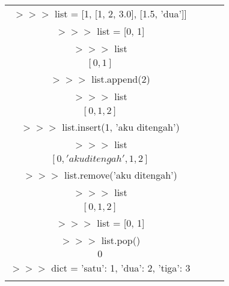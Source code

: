 \begin{tabular}{|c|c|c|c|}
\hline
$>>>$ list = [1, [1, 2, 3.0], [1.5, 'dua']] \\ \linebreak
$>>>$ list = [0, 1] \\ \linebreak
$>>>$ list \\ \linebreak
$[0, 1]$ \\ \linebreak
$>>>$ list.append(2)\\ \linebreak %
$>>>$ list \\ \linebreak
$[0, 1, 2]$ \\ \linebreak
$>>>$ list.insert(1, 'aku ditengah')\\ \linebreak %
$>>>$ list \\ \linebreak
$[0, 'aku ditengah', 1, 2]$ \\ \linebreak
$>>>$ list.remove('aku ditengah')\\ \linebreak %
$>>>$ list \\ \linebreak
$[0, 1, 2]$ \\ \linebreak
$>>>$ list = [0, 1] \\ \linebreak
$>>>$ list.pop() \\ \linebreak
$0$ \\ \linebreak
$>>>$ dict = {'satu': 1, 'dua': 2, 'tiga': 3} \\ \linebreak

\end{tabular}
